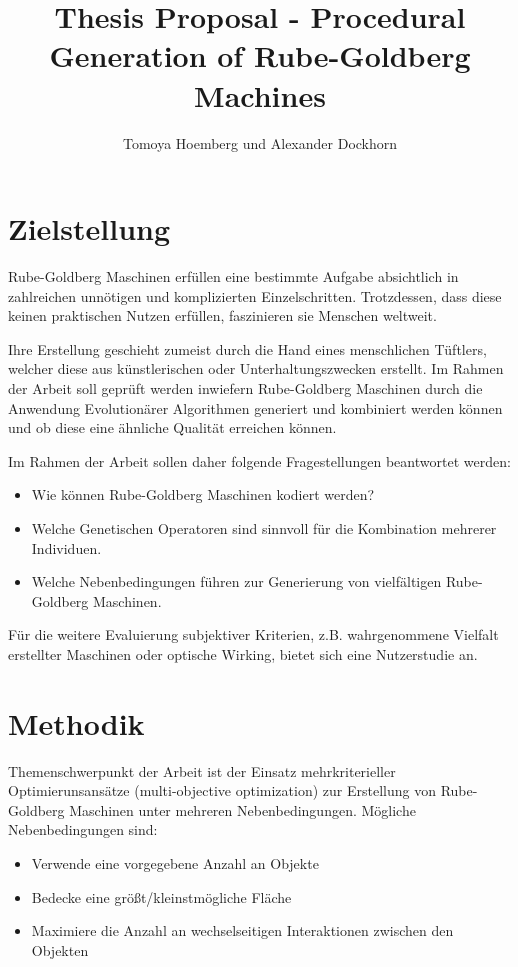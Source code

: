 \documentclass{article}
\begin{document}
\title{\vspace{-2cm}Thesis Proposal - Procedural Generation of Rube-Goldberg Machines}
\author{Tomoya Hoemberg und Alexander Dockhorn}

\maketitle

\section{Zielstellung}

Rube-Goldberg Maschinen erfüllen eine bestimmte Aufgabe absichtlich in zahlreichen unnötigen und komplizierten Einzelschritten. Trotzdessen, dass diese keinen praktischen Nutzen erfüllen, faszinieren sie Menschen weltweit.

Ihre Erstellung geschieht zumeist durch die Hand eines menschlichen Tüftlers, welcher diese aus künstlerischen oder Unterhaltungszwecken erstellt. Im Rahmen der Arbeit soll geprüft werden inwiefern Rube-Goldberg Maschinen durch die Anwendung Evolutionärer Algorithmen generiert und kombiniert werden können und ob diese eine ähnliche Qualität erreichen können.

Im Rahmen der Arbeit sollen daher folgende Fragestellungen beantwortet werden:
\begin{itemize}
	\item Wie können Rube-Goldberg Maschinen kodiert werden?
	\item Welche Genetischen Operatoren sind sinnvoll für die Kombination mehrerer Individuen.
	\item Welche Nebenbedingungen führen zur Generierung von vielfältigen Rube-Goldberg Maschinen.
\end{itemize}

Für die weitere Evaluierung subjektiver Kriterien, z.B. wahrgenommene Vielfalt erstellter Maschinen oder optische Wirking, bietet sich eine Nutzerstudie an.


\section{Methodik}
Themenschwerpunkt der Arbeit ist der Einsatz mehrkriterieller Optimierunsansätze (multi-objective optimization) zur Erstellung von Rube-Goldberg Maschinen unter mehreren Nebenbedingungen. Mögliche Nebenbedingungen sind:
\begin{itemize}
	\item Verwende eine vorgegebene Anzahl an Objekte
	\item Bedecke eine größt/kleinstmögliche Fläche
	\item Maximiere die Anzahl an wechselseitigen Interaktionen zwischen den Objekten
\end{itemize}
\end{document}
